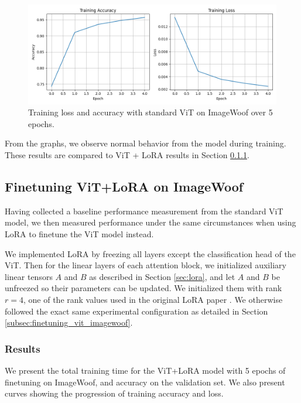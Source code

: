 \documentclass[10pt]{article}
\begin{document}
\begin{figure}[ht]
    \centering
    \includegraphics[width=1\linewidth]{images/training_loss_curve_vanilla.png}
    \caption{Training loss and accuracy with standard ViT on ImageWoof over 5 epochs.}
    \label{fig:placeholder}
\end{figure}

From the graphs, we observe normal behavior from the model during training. These results are compared to ViT + LoRA results in Section \ref{res_lora}.

\subsection{Finetuning ViT+LoRA on ImageWoof}

Having collected a baseline performance measurement from the standard ViT model, we then measured performance under the same circumstances when using LoRA to finetune the ViT model instead.

We implemented LoRA by freezing all layers except the classification head of the ViT. Then for the linear layers of each attention block, we initialized auxiliary linear tensors $A$ and $B$ as described in Section \ref{sec:lora}, and let $A$ and $B$ be unfreezed so their parameters can be updated. We initialized them with rank $r = 4$, one of the rank values used in the original LoRA paper \cite{hu2021loralowrankadaptationlarge}. We otherwise followed the exact same experimental configuration as detailed in Section \ref{subsec:finetuning_vit_imagewoof}.

\subsubsection{Results}
\label{res_lora}

We present the total training time for the ViT+LoRA model with 5 epochs of finetuning on ImageWoof, and accuracy on the validation set. We also present curves showing the progression of training accuracy and loss.
\end{document}
